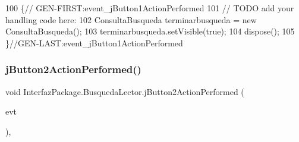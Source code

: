 \begin{DoxyCode}
100                                                                          \{\textcolor{comment}{//
      GEN-FIRST:event\_jButton1ActionPerformed}
101         \textcolor{comment}{// TODO add your handling code here:}
102         ConsultaBusqueda terminarbusqueda = \textcolor{keyword}{new} ConsultaBusqueda();
103         terminarbusqueda.setVisible(\textcolor{keyword}{true});
104         dispose();
105     \}\textcolor{comment}{//GEN-LAST:event\_jButton1ActionPerformed}
\end{DoxyCode}
\mbox{\label{class_interfaz_package_1_1_busqueda_lector_a263c105aa087b2de3d2c5b88a0252131}} 
\subsubsection{\texorpdfstring{j\+Button2\+Action\+Performed()}{jButton2ActionPerformed()}}
{\footnotesize\ttfamily void Interfaz\+Package.\+Busqueda\+Lector.\+j\+Button2\+Action\+Performed (\begin{DoxyParamCaption}\item[{java.\+awt.\+event.\+Action\+Event}]{evt }\end{DoxyParamCaption})\hspace{0.3cm}{\ttfamily [inline]}, {\ttfamily [private]}}


